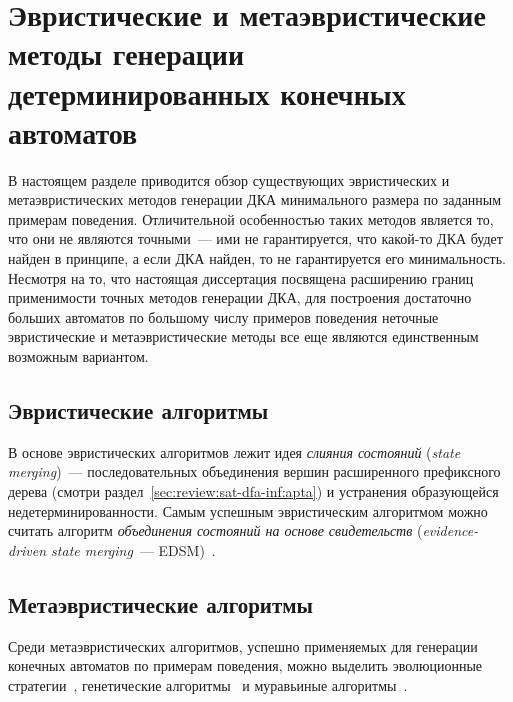 
\section{Эвристические и метаэвристические методы генерации детерминированных конечных автоматов} 
\label{sec:review:heuristic-dfa-inf}

В настоящем разделе приводится обзор существующих эвристических и метаэвристических методов генерации ДКА минимального размера по заданным примерам поведения.
Отличительной особенностью таких методов является то, что они не являются точными~--- ими не гарантируется, что какой-то ДКА будет найден в принципе, а если ДКА найден, то не гарантируется его минимальность.
Несмотря на то, что настоящая диссертация посвящена расширению границ применимости точных методов генерации ДКА, для построения достаточно больших автоматов по большому числу примеров поведения неточные эвристические и метаэвристические методы все еще являются единственным возможным вариантом.

\subsection{Эвристические алгоритмы}
\label{sec:review:heuristic-dfa-inf:heuristic}

В основе эвристических алгоритмов лежит идея \emph{слияния состояний} (\emph{state merging})~--- последовательных объединения вершин расширенного префиксного дерева (смотри раздел~\ref{sec:review:sat-dfa-inf:apta}) и устранения образующейся недетерминированности.
Самым успешным эвристическим алгоритмом можно считать алгоритм \emph{объединения состояний на основе свидетельств} (\emph{evidence-driven state merging}~--- EDSM)~\cite{DBLP:conf/icgi/LangPP98}.


\subsection{Метаэвристические алгоритмы}
\label{sec:review:heuristic-dfa-inf:metaheuristic}

Среди метаэвристических алгоритмов, успешно применяемых для генерации конечных автоматов по примерам поведения, можно выделить эволюционные стратегии~\cite{DBLP:journals/pami/LucasR05,DBLP:conf/cec/Gomez06}, генетические алгоритмы~\cite{genetic-algs-dfa-inf-egorov-13} и муравьиные алгоритмы~\cite{chivilikhin-phd-15}.


